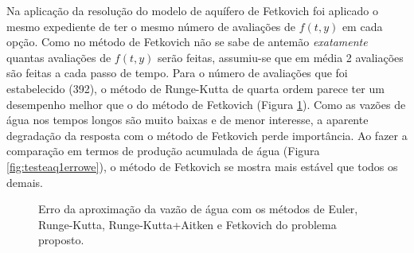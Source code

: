 \documentclass[final,5p]{elsarticle}
\numberwithin{equation}{section}
\begin{document}
        Na aplicação da resolução do modelo de aquífero de Fetkovich foi aplicado o mesmo expediente de ter o mesmo número de avaliações de $f(t,y)$ em cada opção. Como no método de Fetkovich não se sabe de antemão \emph{exatamente} quantas avaliações de $f(t,y)$ serão feitas, assumiu-se que em média 2 avaliações são feitas a cada passo de tempo. Para o número de avaliações que foi estabelecido (392), o método de Runge-Kutta de quarta ordem parece ter um desempenho melhor que o do método de Fetkovich (Figura \ref{fig:testeaq1erroqw}). Como as vazões de água nos tempos longos são muito baixas e de menor interesse, a aparente degradação da resposta com o método de Fetkovich perde importância. Ao fazer a comparação em termos de produção acumulada de água (Figura \ref{fig:testeaq1errowe}), o método de Fetkovich se mostra mais estável que todos os demais.

        \begin{figure}[hbt!]
            \caption{Erro da aproximação da vazão de água com os métodos de Euler, Runge-Kutta, Runge-Kutta+Aitken e Fetkovich do problema proposto.}
            \label{fig:testeaq1erroqw}
        \end{figure}
\end{document}
